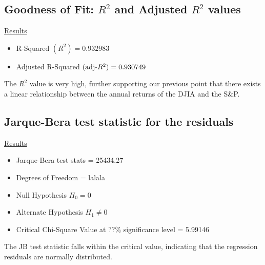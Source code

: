 \documentclass[a4paper]{article}
\begin{document}
	\subsection{Goodness of Fit: $R^2$ and Adjusted $R^2$ values}
	\underline{Results}
	\begin{itemize}[nosep]
		\item R-Squared $(R^2) = 0.932983$
		\item Adjusted R-Squared $(\textnormal{adj-}R^2) = 0.930749$
	\end{itemize}

     The $R^2$ value is very high, further supporting our previous point that there exists a linear relationship between the annual returns of the DJIA and the S\&P.
	
	\subsection{Jarque-Bera test statistic for the residuals}
	\underline{Results}
	\begin{itemize}[nosep]
		\item Jarque-Bera test stats = 25434.27
		\item Degrees of Freedom = lalala
		\item Null Hypothesis $H_0 = 0$
		\item Alternate Hypothesis $H_1 \ne 0$
		\item Critical Chi-Square Value at  ??\% significance level = 5.99146
	\end{itemize}
	
	The JB test statistic falls within the critical value, indicating that the regression residuals are normally distributed. 
	
\end{document}
